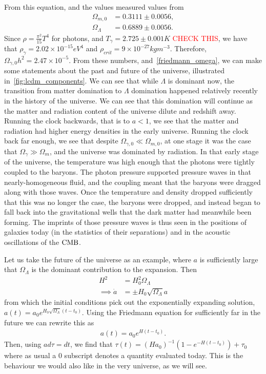     From this equation, and the values measured values from~\cite{Planck_parameters_2018}
    \begin{align}\label{measured_params}
        \Omega_{m,0} &= 0.3111 \pm 0.0056,\\
        \Omega_{\Lambda} &=  0.6889 \pm 0.0056.
    \end{align}
    Since
    $\rho = \frac{\pi^2}{15}T^4$
    for photons, and $T_{\gamma}=2.725\pm0.001K$ \textcolor{red}{CHECK THIS},
    we have that $\rho_{\gamma}=2.02\times 10^{-15} eV^4$
    and $\rho_{crit}=9\times 10^{-27} kg m^{-3}$.
    Therefore, $\Omega_{\gamma,0}h^2=2.47\times 10^{-5}$.
    From these numbers, and~\eqref{friedmann_omega}, we can make some statements
    about the past and future of the universe, illustrated in~\ref{fig:lcdm_components}.
    We can see that while $\Lambda$ is dominant now, the transition from matter domination
    to $\Lambda$ domination happened relatively recently in the history of the universe.
    We can see that this domination will continue as the matter and radiation content of the
    universe dilute and redshift away.
    Running the clock backwards, that is to $a<1$, we see that the matter and radiation had
    higher energy densities in the early universe. Running the clock back far enough, we see
    that despite $\Omega_{\gamma,0}\ll\Omega_{m,0}$, at one stage it was the
    case that $\Omega_{\gamma}\gg\Omega_{m}$, and the universe was dominated by radiation.
    In that early stage of the universe, the temperature was high enough that the photons
    were tightly coupled to the baryons. The photon pressure supported pressure waves in that
    nearly-homogeneous fluid, and the coupling meant that the baryons were dragged along with those
    waves. Once the temperature and density dropped sufficiently that this was no longer the case,
    the baryons were dropped, and instead began to fall back into the gravitational wells that the dark matter
    had meanwhile been forming. The imprints of those pressure waves is thus seen in the positions
    of galaxies today (in the statistics of their separations) and in the acoustic oscillations of the $\text{CMB}$.


    Let us take the future of the universe as an example, where $a$ is sufficiently large that $\Omega_{\Lambda}$
    is the dominant contribution to the expansion.
    Then
    \begin{align}
        H^2 &= H_0^2\Omega_{\Lambda}\\
        \implies \dot{a} &= \pm H_0\sqrt{\Omega_{\Lambda}}a
    \end{align}
    from which the initial conditions pick out the exponentially expanding solution,\\
    ${a(t)=a_0e^{H_0\sqrt{\Omega_{\Lambda}}\left(t-t_0\right)}}$. Using the Friedmann equation
    for sufficiently far in the future we can rewrite this as
    \begin{align}
        a(t)=a_0e^{H\left(t-t_0\right)}.
    \end{align}
    Then, using $ad\tau=dt$, we find that ${\tau(t)=(Ha_0)^{-1}\left(1-e^{-H(t-t_0)}\right)+\tau_0}$
    where as usual a $0$ subscript denotes a quantity evaluated today.
    This is the behaviour we would also like in the very universe, as we will see.

